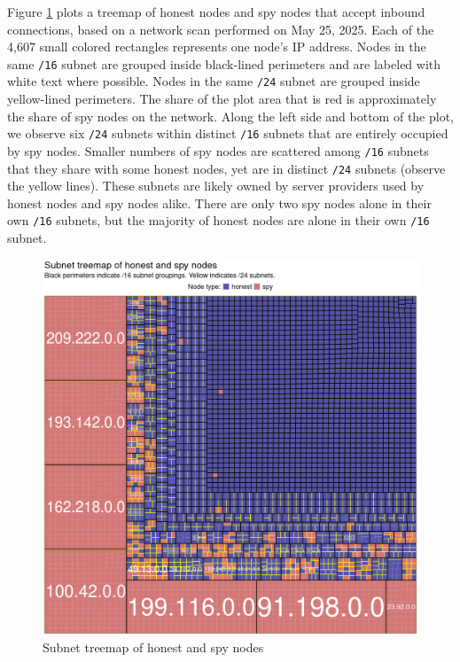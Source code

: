\documentclass[english]{mrl}
\theoremstyle{plain}
\begin{document}
Figure \ref{fig-pre-dedup-treemap} plots a treemap of honest nodes
and spy nodes that accept inbound connections, based on a network
scan performed on May 25, 2025. Each of the 4,607 small colored rectangles
represents one node's IP address. Nodes in the same \texttt{/16} subnet
are grouped inside black-lined perimeters and are labeled with white
text where possible. Nodes in the same \texttt{/24} subnet are grouped
inside yellow-lined perimeters. The share of the plot area that is
red is approximately the share of spy nodes on the network. Along
the left side and bottom of the plot, we observe six \texttt{/24}
subnets within distinct \texttt{/16} subnets that are entirely occupied
by spy nodes. Smaller numbers of spy nodes are scattered among \texttt{/16}
subnets that they share with some honest nodes, yet are in distinct
\texttt{/24} subnets (observe the yellow lines). These subnets are
likely owned by server providers used by honest nodes and spy nodes
alike. There are only two spy nodes alone in their own \texttt{/16}
subnets, but the majority of honest nodes are alone in their own \texttt{/16}
subnet.

\begin{figure}[H]
\caption{Subnet treemap of honest and spy nodes}

\label{fig-pre-dedup-treemap}

\includegraphics[scale=0.5]{images/treemap-status-quo}
\end{figure}
\end{document}
